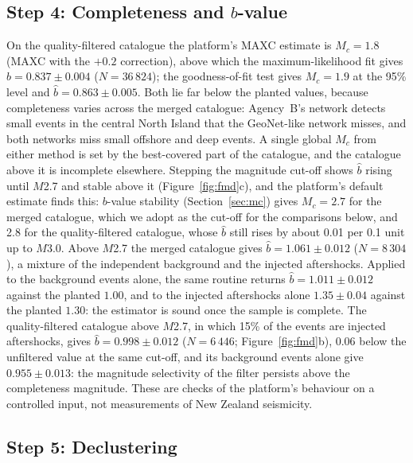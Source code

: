 \documentclass[12pt]{article}
\begin{document}
\subsection{Step 4: Completeness and $b$-value}

On the quality-filtered catalogue the platform's MAXC estimate is
$M_c = 1.8$ (MAXC with the $+0.2$ correction), above which the maximum-likelihood
fit gives $\hat{b} = 0.837 \pm 0.004$ ($N = 36\,824$); the goodness-of-fit test
gives $M_c = 1.9$ at the 95\% level and $\hat{b} = 0.863 \pm 0.005$.  Both lie
far below the planted values, because completeness varies across the merged
catalogue: Agency~B's network detects small events in the central North Island
that the GeoNet-like network misses, and both networks miss small offshore and
deep events.  A single global $M_c$ from either method is set by the
best-covered part of the catalogue, and the catalogue above it is incomplete
elsewhere.  Stepping the magnitude cut-off shows $\hat{b}$ rising until $M$2.7
and stable above it (Figure~\ref{fig:fmd}c), and the platform's default
estimate finds this: $b$-value stability (Section~\ref{sec:mc}) gives
$M_c = 2.7$ for the merged catalogue, which we adopt as the cut-off for the
comparisons below, and 2.8 for the quality-filtered catalogue, whose $\hat{b}$
still rises by about 0.01 per 0.1 unit up to $M$3.0.  Above $M$2.7 the
merged catalogue gives $\hat{b} = 1.061 \pm 0.012$ ($N = 8\,304$), a mixture of
the independent background and the injected aftershocks.  Applied to the
background events alone, the same routine returns $\hat{b} = 1.011 \pm 0.012$
against the planted $1.00$, and to the injected aftershocks alone
$1.35 \pm 0.04$ against the planted $1.30$: the estimator is sound once the
sample is complete.  The quality-filtered catalogue above $M$2.7, in which 15\%
of the events are injected aftershocks, gives $\hat{b} = 0.998 \pm 0.012$
($N = 6\,446$; Figure~\ref{fig:fmd}b), 0.06 below the unfiltered value at the
same cut-off, and its background events alone give $0.955 \pm 0.013$: the
magnitude selectivity of the filter persists above the completeness magnitude.
These are checks of the platform's behaviour on a controlled input, not
measurements of New Zealand seismicity.

\subsection{Step 5: Declustering}
\end{document}
